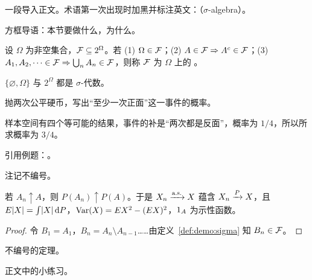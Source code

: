 \documentclass{yupin-notes}
\begin{document}
\makecoursetitle
\tableofcontents

\label{lec:demo}

一段导入正文。术语第一次出现时加黑并标注英文：（$\sigma$-algebra）。


\begin{summary}
方框导语：本节要做什么，为什么。
\end{summary}

\begin{definition}[$\sigma$-代数]\label{def:demo:sigma}
设 $\Omega$ 为非空集合，$\mathcal{F}\subseteq 2^\Omega$。若 (1) $\Omega\in\mathcal{F}$；(2) $A\in\mathcal{F}\Rightarrow A^c\in\mathcal{F}$；(3) $A_1,A_2,\dots\in\mathcal{F}\Rightarrow\bigcup_n A_n\in\mathcal{F}$，则称 $\mathcal{F}$ 为 $\Omega$ 上的 。
\end{definition}

\begin{example}
$\{\varnothing,\Omega\}$ 与 $2^\Omega$ 都是 $\sigma$-代数。
\end{example}

\begin{workedexample}\label{we:demo:coin}
抛两次公平硬币，写出“至少一次正面”这一事件的概率。
\end{workedexample}
\begin{solution}
样本空间有四个等可能的结果，事件的补是“两次都是反面”，概率为 $1/4$，所以所求概率为 $3/4$。
\end{solution}

引用例题：。

\begin{remark}
注记不编号。
\end{remark}

\begin{theorem}[测度的连续性]\label{thm:demo:cont}
若 $A_n\uparrow A$，则 $P(A_n)\uparrow P(A)$。于是 $X_n\xrightarrow{\text{a.s.}} X$ 蕴含 $X_n\xrightarrow{P} X$，且 $E\lvert X\rvert=\int\lvert X\rvert\,\mathrm{d} P$，$\operatorname{Var}(X)=E X^2-(EX)^2$，$1_A$ 为示性函数。
\end{theorem}
\begin{proof}
令 $B_1=A_1$，$B_n=A_n\setminus A_{n-1}$……由定义~\ref{def:demo:sigma} 知 $B_n\in\mathcal{F}$。
\end{proof}

\begin{theorem*}
不编号的定理。
\end{theorem*}

\begin{practice}
正文中的小练习。
\end{practice}
\end{document}
